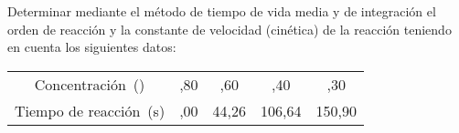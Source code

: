 Determinar mediante el método de tiempo de vida media y de integración el orden de reacción y la constante de velocidad (cinética) de la reacción  teniendo en cuenta los siguientes datos:
\begin{center}
	\begin{tabular}{cSSSS}
		\toprule
		Concentración~(\si{\Molar})			&	,80	&	  ,60	&	   ,40	&	   ,30	\\	
		Tiempo de reacción~(\si{\second})	&	,00	&	44,26	&	106,64	&	150,90	\\
		\bottomrule
	\end{tabular}
\end{center}
